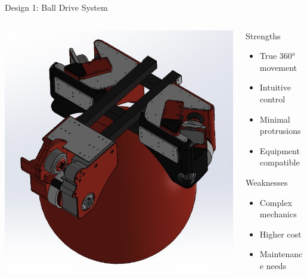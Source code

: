 \documentclass[aspectratio=169]{beamer}
\begin{document}
\begin{frame}{Design 1: Ball Drive System}
\begin{columns}[c]
\begin{column}{0.5\textwidth}
\includegraphics[height=0.6\textheight]{pdpAssets/PreliminaryDesignCadRendering.jpg}
\end{column}

\begin{column}{0.48\textwidth}
\begin{block}{Strengths}
\begin{itemize}
    \item True 360° movement
    \item Intuitive control
    \item Minimal protrusions
    \item Equipment compatible
\end{itemize}
\end{block}

\begin{block}{Weaknesses}
\begin{itemize}
    \item Complex mechanics
    \item Higher cost
    \item Maintenance needs
\end{itemize}
\end{block}
\end{column}
\end{columns}
\end{frame}
\end{document}
